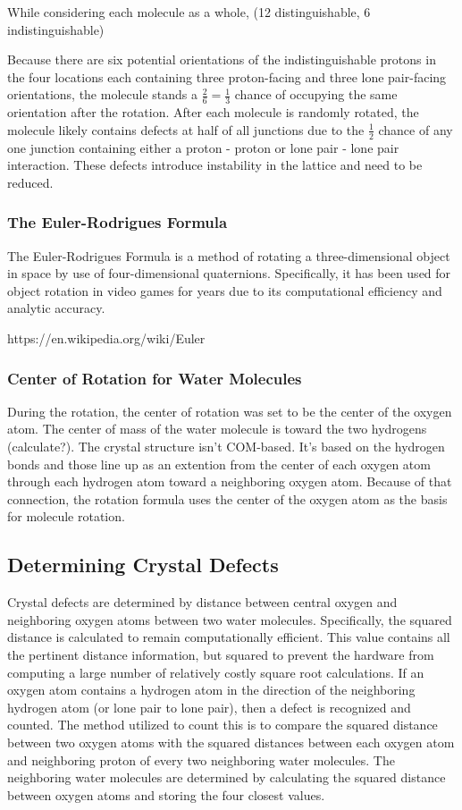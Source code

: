 While considering each molecule as a whole, (12 distinguishable, 6 indistinguishable)

Because there are six potential orientations of the indistinguishable protons in the four locations each containing three proton-facing and three lone pair-facing orientations, the molecule stands a $\frac{2}{6} = \frac{1}{3}$ chance of occupying the same orientation after the rotation.
After each molecule is randomly rotated, the molecule likely contains defects at half of all junctions due to the $\frac{1}{2}$ chance of any one junction containing either a proton - proton or lone pair - lone pair interaction. 
These defects introduce instability in the lattice and need to be reduced.

\subsubsection{The Euler-Rodrigues Formula}
The Euler-Rodrigues Formula is a method of rotating a three-dimensional object in space by use of four-dimensional quaternions. 
Specifically, it has been used for object rotation in video games for years due to its computational efficiency and analytic accuracy.

https://en.wikipedia.org/wiki/Euler%

\subsubsection{Center of Rotation for Water Molecules}
During the rotation, the center of rotation was set to be the center of the oxygen atom. 
The center of mass of the water molecule is toward the two hydrogens (calculate?). 
The crystal structure isn’t COM-based. 
It’s based on the hydrogen bonds and those line up as an extention from the center of each oxygen atom through each hydrogen atom toward a neighboring oxygen atom. 
Because of that connection, the rotation formula uses the center of the oxygen atom as the basis for molecule rotation.

\subsection{Determining Crystal Defects}
Crystal defects are determined by distance between central oxygen and neighboring oxygen atoms between two water molecules. 
Specifically, the squared distance is calculated to remain computationally efficient. 
This value contains all the pertinent distance information, but squared to prevent the hardware from computing a large number of relatively costly square root calculations. 
If an oxygen atom contains a hydrogen atom in the direction of the neighboring hydrogen atom (or lone pair to lone pair), then a defect is recognized and counted. 
The method utilized to count this is to compare the squared distance between two oxygen atoms with the squared distances between each oxygen atom and neighboring proton of every two neighboring water molecules. 
The neighboring water molecules are determined by calculating the squared distance between oxygen atoms and storing the four closest values.

